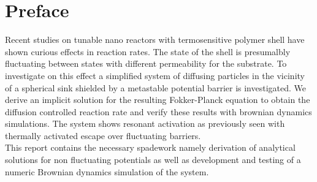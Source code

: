 \section{Preface}
Recent studies on tunable nano reactors with termosensitive polymer shell have shown curious effects in reaction rates.
The state of the shell is presumalbly fluctuating between states with different permeability for the substrate.
To investigate on this effect a simplified system of diffusing particles in the vicinity of a spherical sink shielded by a metastable potential barrier is investigated. We derive an implicit solution for the resulting Fokker-Planck equation to obtain the diffusion controlled reaction rate and verify these results with brownian dynamics simulations. The system shows resonant activation as previously seen with thermally activated escape over fluctuating barriers.\\
\newline
This report contains the necessary spadework namely derivation of analytical solutions for non fluctuating potentials as well as development and testing of a numeric Brownian dynamics simulation of the system.
\newpage
\tableofcontents
\newpage
